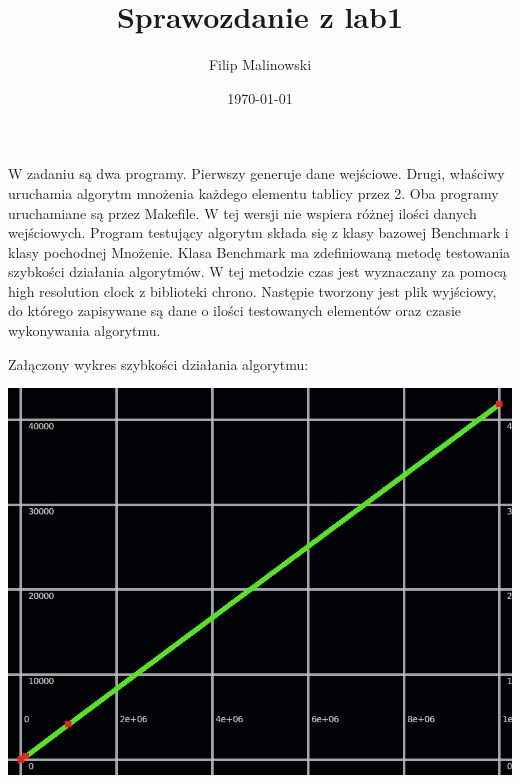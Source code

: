 \documentclass[a4paper,10pt]{scrartcl}
\title{}
\author{}
\date{}
\begin{document}
\title{Sprawozdanie z lab1}
\author{Filip Malinowski}
\date{\today}

\maketitle

W zadaniu są dwa programy. Pierwszy generuje dane wejściowe.
Drugi, właściwy uruchamia algorytm mnożenia każdego elementu
tablicy przez 2. Oba programy uruchamiane są przez Makefile.
W tej wersji nie wspiera różnej ilości danych wejściowych.
Program testujący algorytm składa się z klasy bazowej
Benchmark i klasy pochodnej Mnożenie. Klasa Benchmark ma
zdefiniowaną metodę testowania szybkości działania
algorytmów. W tej metodzie czas jest wyznaczany za pomocą
high resolution clock z biblioteki chrono. Następie tworzony
jest plik wyjściowy, do którego zapisywane są dane o ilości
testowanych elementów oraz czasie wykonywania algorytmu.

Załączony wykres szybkości działania algorytmu:

\includegraphics[scale=0.3]{ret_data}
\end{document}
